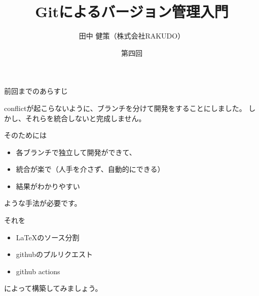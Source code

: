 \documentclass[12pt, unicode]{beamer}
\title{Gitによるバージョン管理入門}
\author{田中 健策（株式会社RAKUDO）}
\date[2020/12/25]{第四回}
\begin{document}
\frame{\maketitle}

\begin{frame}{前回までのあらすじ}

conflictが起こらないように、ブランチを分けて開発をすることにしました。
しかし、それらを統合しないと完成しません。

そのためには

\begin{itemize}
\item 各ブランチで独立して開発ができて、
\item 統合が楽で（人手を介さず、自動的にできる）
\item 結果がわかりやすい
\end{itemize}

ような手法が必要です。

それを
\begin{itemize}
\item LaTeXのソース分割
\item githubのプルリクエスト
\item github actions
\end{itemize}
によって構築してみましょう。

\end{frame}
\end{document}
